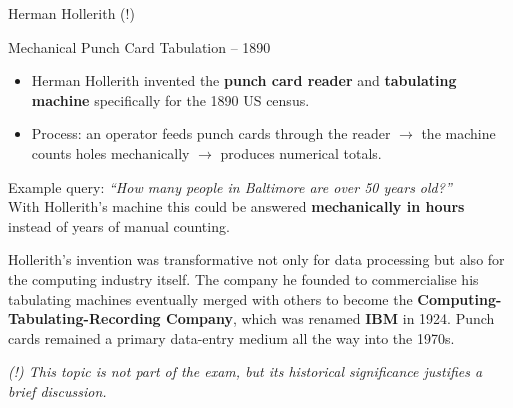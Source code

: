 \begin{frame}{Herman Hollerith (!)}
  \begin{block}{Mechanical Punch Card Tabulation -- 1890}
    \begin{itemize}
      \item Herman Hollerith invented the \textbf{punch card reader} and
            \textbf{tabulating machine} specifically for the 1890 US census.
      \item Process: an operator feeds punch cards through the reader
            $\rightarrow$ the machine counts holes mechanically
            $\rightarrow$ produces numerical totals.
    \end{itemize}
  \end{block}

  \begin{examples}{}
    Example query: \emph{``How many people in Baltimore are over 50 years old?''}\\
    With Hollerith's machine this could be answered \textbf{mechanically in hours}
    instead of years of manual counting.
  \end{examples}

  Hollerith's invention was transformative not only for data processing but also
  for the computing industry itself.  The company he founded to commercialise
  his tabulating machines eventually merged with others to become the
  \textbf{Computing-Tabulating-Recording Company}, which was renamed
  \textbf{IBM} in 1924.  Punch cards remained a primary data-entry medium
  all the way into the 1970s.

  \smallskip
  \textit{(!) This topic is not part of the exam, but its historical significance
  justifies a brief discussion.}
\end{frame}

